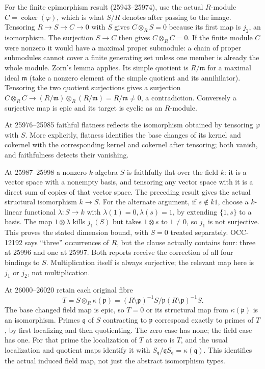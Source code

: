 For the finite epimorphism result (25943--25974), use the actual \(R\)-module \(C=\operatorname{coker}(\varphi)\), which is what \(S/R\) denotes after passing to the image. Tensoring \(R\to S\to C\to0\) with \(S\) gives \(C\otimes_RS=0\) because its first map is \(j_2\), an isomorphism. The surjection \(S\to C\) then gives \(C\otimes_RC=0\). If the finite module \(C\) were nonzero it would have a maximal proper submodule: a chain of proper submodules cannot cover a finite generating set unless one member is already the whole module. Zorn's lemma applies. Its simple quotient is \(R/\mathfrak m\) for a maximal ideal \(\mathfrak m\) (take a nonzero element of the simple quotient and its annihilator). Tensoring the two quotient surjections gives a surjection \(C\otimes_RC\to(R/\mathfrak m)\otimes_R(R/\mathfrak m)=R/\mathfrak m\ne0\), a contradiction. Conversely a surjective map is epic and its target is cyclic as an \(R\)-module.

At 25976--25985 faithful flatness reflects the isomorphism obtained by tensoring \(\varphi\) with \(S\). More explicitly, flatness identifies the base changes of its kernel and cokernel with the corresponding kernel and cokernel after tensoring; both vanish, and faithfulness detects their vanishing.

At 25987--25998 a nonzero \(k\)-algebra \(S\) is faithfully flat over the field \(k\): it is a vector space with a nonempty basis, and tensoring any vector space with it is a direct sum of copies of that vector space. The preceding result gives the actual structural isomorphism \(k\to S\). For the alternate argument, if \(s\notin k1\), choose a \(k\)-linear functional \(\lambda:S\to k\) with \(\lambda(1)=0,\lambda(s)=1\), by extending \(\{1,s\}\) to a basis. The map \(1\otimes\lambda\) kills \(j_1(S)\) but takes \(1\otimes s\) to \(1\ne0\), so \(j_1\) is not surjective. This proves the stated dimension bound, with \(S=0\) treated separately. OCC-12192 says ``three'' occurrences of \(R\), but the clause actually contains four: three at 25996 and one at 25997. Both reports receive the correction of all four bindings to \(S\). Multiplication itself is always surjective; the relevant map here is \(j_1\) or \(j_2\), not multiplication.

At 26000--26020 retain each original fibre \[
T=S\otimes_R\kappa(\mathfrak p)
=(R\setminus\mathfrak p)^{-1}S/
 \mathfrak p(R\setminus\mathfrak p)^{-1}S .
\] The base changed field map is epic, so \(T=0\) or its structural map from \(\kappa(\mathfrak p)\) is an isomorphism. Primes \(\mathfrak q\) of \(S\) contracting to \(\mathfrak p\) correspond exactly to primes of \(T\), by first localizing and then quotienting. The zero case has none; the field case has one. For that prime the localization of \(T\) at zero is \(T\), and the usual localization and quotient maps identify it with \(S_{\mathfrak q}/\mathfrak qS_{\mathfrak q}=\kappa(\mathfrak q)\). This identifies the actual induced field map, not just the abstract isomorphism types.

